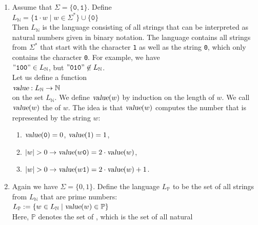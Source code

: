 \examplesEng
\begin{enumerate}
\item Assume that $\Sigma = \{\mathtt{0},\mathtt{1}\}$.  Define
      \\[0.2cm]
      \hspace*{1.3cm}
      $L_\mathbb{N} = \{ \mathtt{1} \cdot w \mid w \in \Sigma^* \} \cup \{ \mathtt{0} \}$
      \\[0.2cm]
      Then $L_\mathbb{N}$ is the language consisting of all strings that can be interpreted as
      natural numbers given in binary notation.  The language contains all strings from $\Sigma^*$  that start with 
      the character \texttt{1} as well as the string \texttt{0}, which only contains the character
      \texttt{0}.  For example, we have
      \\[0.2cm]
      \hspace*{1.3cm}
      $\mathtt{\symbol{34}100\symbol{34}} \in L_\mathbb{N}$, \quad but \quad $\mathtt{\symbol{34}010\symbol{34}} \not\in L_\mathbb{N}$.
      \\[0.2cm]
      Let us define a function 
      \\[0.2cm]
      \hspace*{1.3cm}
      $\textsl{value}: L_\mathbb{N} \rightarrow \mathbb{N}$
      \\[0.2cm]
      on the set $L_\mathbb{N}$.  We define $\textsl{value}(w)$ by induction on the length of $w$.
      We call $\textsl{value}(w)$ the  of $w$.  The idea is that
      $\textsl{value}(w)$ computes the number that is represented by the string $w$:
      \begin{enumerate}
      \item $\textsl{value}(\mathtt{0}) = 0$, $\textsl{value}(1) = 1$,
      \item $|w| > 0 \rightarrow \textsl{value}(w\mathtt{0}) = 2 \cdot \textsl{value}(w)   $,
      \item $|w| > 0 \rightarrow \textsl{value}(w\mathtt{1}) = 2 \cdot \textsl{value}(w) + 1$.
      \end{enumerate}
\item Again we have $\Sigma = \{0,1\}$. Define the language $L_\mathbb{P}$
      to be the set of all strings from $L_\mathbb{N}$ that are prime numbers:
      \\[0.2cm]
      \hspace*{1.3cm}
      $L_\mathbb{P} := \{ w \in L_\mathbb{N} \mid \textsl{value}(w) \in \mathbb{P} \}$
      \\[0.2cm]
      Here, $\mathbb{P}$ denotes the set of ,  which is the set of all natural

\end{enumerate}
